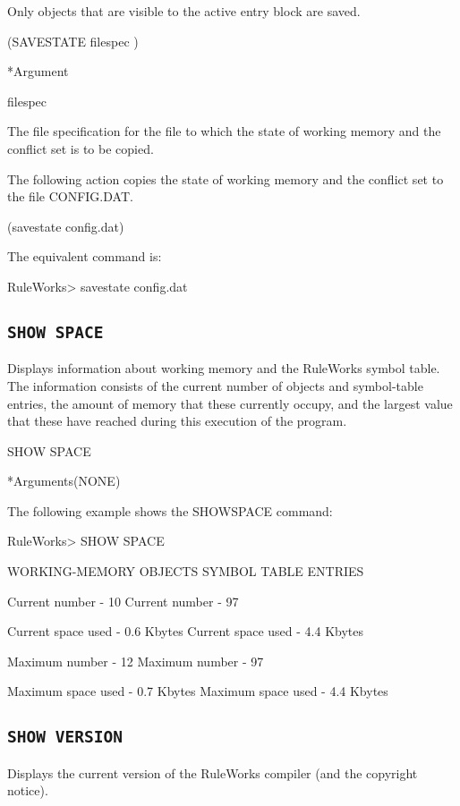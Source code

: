 {{Only objects that are visible to the active entry block are
saved.

\Format

(SAVESTATE filespec )

*Argument

filespec

The file specification for the file to which the state of
working memory and the conflict set is to be copied.

\Example

The following action copies the state of working memory and
the conflict set to the file CONFIG.DAT.

(savestate config.dat)

The equivalent command is:

RuleWorks> savestate config.dat

\subsection{\tt{SHOW SPACE}}

Displays information about working memory and the RuleWorks
symbol table. The information consists of the current number
of objects and symbol-table entries, the amount of memory
that these currently occupy, and the largest value that these
have reached during this execution of the program.

\Format

SHOW SPACE

*Arguments(NONE)
\Example

The following example shows the SHOWSPACE command:

RuleWorks> SHOW SPACE

WORKING-MEMORY OBJECTS SYMBOL TABLE ENTRIES

Current number - 10 Current number - 97

Current space used - 0.6 Kbytes Current space used - 4.4
Kbytes

Maximum number - 12 Maximum number - 97

Maximum space used - 0.7 Kbytes Maximum space used - 4.4
Kbytes

\subsection{\tt{SHOW VERSION}}

Displays the current version of the RuleWorks compiler (and
the copyright notice).

\Format

}}
